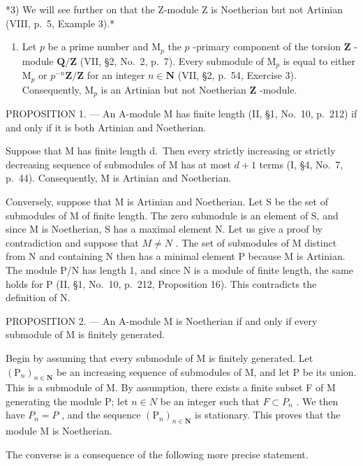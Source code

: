 *3) We will see further on that the Z-module Z is Noetherian but not Artinian (VIII, p.~5, Example 3).*

\begin{enumerate}
\def\labelenumi{\arabic{enumi})}
\setcounter{enumi}{3}
\tightlist
\item
  Let \(p\) be a prime number and \(\mathrm{M}_p\) the \(p\) -primary component of the torsion \(\mathbf{Z}\) -module \(\mathbf{Q} / \mathbf{Z}\) (VII, §2, No.~2, p.~7). Every submodule of \(\mathrm{M}_p\) is equal to either \(\mathrm{M}_p\) or \(p^{-n}\mathbf{Z} / \mathbf{Z}\) for an integer \(n \in \mathbf{N}\) (VII, §2, p.~54, Exercise 3). Consequently, \(\mathrm{M}_p\) is an Artinian but not Noetherian \(\mathbf{Z}\) -module.
\end{enumerate}

PROPOSITION 1. --- An A-module M has finite length (II, §1, No.~10, p.~212) if and only if it is both Artinian and Noetherian.

Suppose that M has finite length d.~Then every strictly increasing or strictly decreasing sequence of submodules of M has at most \(d+1\) terms (I, §4, No.~7, p.~44). Consequently, M is Artinian and Noetherian.

Conversely, suppose that M is Artinian and Noetherian. Let S be the set of submodules of M of finite length. The zero submodule is an element of S, and since M is Noetherian, S has a maximal element N. Let us give a proof by contradiction and suppose that \(M \neq N\) . The set of submodules of M distinct from N and containing N then has a minimal element P because M is Artinian. The module P/N has length 1, and since N is a module of finite length, the same holds for P (II, §1, No.~10, p.~212, Proposition 16). This contradicts the definition of N.

PROPOSITION 2. --- An A-module M is Noetherian if and only if every submodule of M is finitely generated.

Begin by assuming that every submodule of M is finitely generated. Let \((\mathrm{P}_{n})_{n\in\mathbf{N}}\) be an increasing sequence of submodules of M, and let P be its union. This is a submodule of M. By assumption, there exists a finite subset F of M generating the module P; let \(n\in N\) be an integer such that \(F\subset P_{n}\) . We then have \(P_{n}=P\) , and the sequence \((\mathrm{P}_{n})_{n\in\mathbf{N}}\) is stationary. This proves that the module M is Noetherian.

The converse is a consequence of the following more precise statement.

